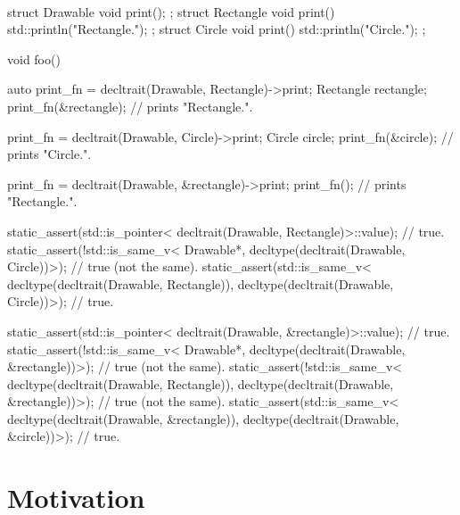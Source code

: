\documentclass{article}
\begin{document}
\paragraph{}
\begin{codeblock}
struct Drawable { void print(); };
struct Rectangle { void print() { std::println("Rectangle."); } };
struct Circle { void print() { std::println("Circle."); } };

void foo() {
  auto print_fn = decltrait(Drawable, Rectangle)->print;
  Rectangle rectangle;
  print_fn(&rectangle); // prints "Rectangle.".

  print_fn = decltrait(Drawable, Circle)->print;
  Circle circle;
  print_fn(&circle); // prints "Circle.".

  print_fn = decltrait(Drawable, &rectangle)->print;
  print_fn(); // prints "Rectangle.".

  static_assert(std::is_pointer<
    decltrait(Drawable, Rectangle)>::value); // true.
  static_assert(!std::is_same_v<
    Drawable*,
    decltype(decltrait(Drawable, Circle))>); // true (not the same).
  static_assert(std::is_same_v<
    decltype(decltrait(Drawable, Rectangle)),
    decltype(decltrait(Drawable, Circle))>); // true.

  static_assert(std::is_pointer<
    decltrait(Drawable, &rectangle)>::value); // true.
  static_assert(!std::is_same_v<
    Drawable*,
    decltype(decltrait(Drawable, &rectangle))>); // true (not the same).
  static_assert(!std::is_same_v<
    decltype(decltrait(Drawable, Rectangle)),
    decltype(decltrait(Drawable, &rectangle))>); // true (not the same).
  static_assert(std::is_same_v<
    decltype(decltrait(Drawable, &rectangle)),
    decltype(decltrait(Drawable, &circle))>); // true.
}
\end{codeblock}

\section{Motivation}
\end{document}
